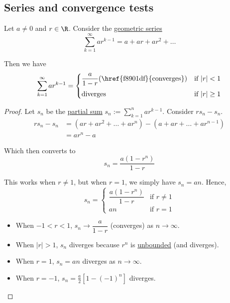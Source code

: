 \subsection{Series and convergence tests}\label{d9e402e}

\label{fca26f6}

Let $a\neq0$ and $r\in\R$. Consider the \href{ae21a85}{geometric series}
$$
  \sum_{k=1}^\infty ar^{k-1}=a+ar+ar^2+\ldots
$$

Then we have
$$
  \sum_{k=1}^\infty ar^{k-1}=\begin{cases}
    \dfrac a{1-r}\text{(\href{f8901df}{converges})} & \text{if }|r|<1    \\[0.8em]
    \text{diverges}                                 & \text{if }|r|\geq1 \\
  \end{cases}
$$

\begin{proof}
  Let $s_n$ be the \href{a835138}{partial sum} $\displaystyle
  s_n:=\sum_{k=1}^nar^{k-1}$. Consider $rs_n-s_n$.
  \begin{align*}
    rs_n-s_n &=(ar+ar^2+\ldots+ar^n)-(a+ar+\ldots+ar^{n-1}) \\
             &=ar^n-a
  \end{align*}

  Which then converts to
  $$
    s_n=\frac{a(1-r^n)}{1-r}
  $$

  This works when $r\neq1$, but when $r=1$, we simply have $s_n=an$. Hence,
  $$
    s_n=\begin{cases}
      \dfrac{a(1-r^n)}{1-r} & \text{if }r\neq1 \\
      an                    & \text{if }r=1
    \end{cases}
  $$

  \begin{itemize}
    \item When $-1<r<1$, $s_n\to\dfrac a{1-r}$ (converges) as $n\to\infty$.
    \item When $|r|>1$, $s_n$ diverges because $r^n$ is
          \href{e4698be}{unbounded} (and diverges).
    \item When $r=1$, $s_n=an$ diverges as $n\to\infty$.
    \item When $r=-1$, $s_n=\frac a2[1-(-1)^n]$ diverges.
  \end{itemize}
\end{proof}

\label{f5cf40a}

